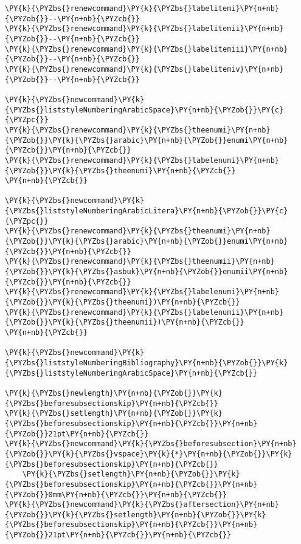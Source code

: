 \begin{Verbatim}[commandchars=\\\{\}]
\PY{k}{\PYZbs{}renewcommand}\PY{k}{\PYZbs{}labelitemi}\PY{n+nb}{\PYZob{}}--\PY{n+nb}{\PYZcb{}}
\PY{k}{\PYZbs{}renewcommand}\PY{k}{\PYZbs{}labelitemii}\PY{n+nb}{\PYZob{}}--\PY{n+nb}{\PYZcb{}}
\PY{k}{\PYZbs{}renewcommand}\PY{k}{\PYZbs{}labelitemiii}\PY{n+nb}{\PYZob{}}--\PY{n+nb}{\PYZcb{}}
\PY{k}{\PYZbs{}renewcommand}\PY{k}{\PYZbs{}labelitemiv}\PY{n+nb}{\PYZob{}}--\PY{n+nb}{\PYZcb{}}

\PY{k}{\PYZbs{}newcommand}\PY{k}{\PYZbs{}liststyleNumberingArabicSpace}\PY{n+nb}{\PYZob{}}\PY{c}{\PYZpc{}}
\PY{k}{\PYZbs{}renewcommand}\PY{k}{\PYZbs{}theenumi}\PY{n+nb}{\PYZob{}}\PY{k}{\PYZbs{}arabic}\PY{n+nb}{\PYZob{}}enumi\PY{n+nb}{\PYZcb{}}\PY{n+nb}{\PYZcb{}}
\PY{k}{\PYZbs{}renewcommand}\PY{k}{\PYZbs{}labelenumi}\PY{n+nb}{\PYZob{}}\PY{k}{\PYZbs{}theenumi}\PY{n+nb}{\PYZcb{}}
\PY{n+nb}{\PYZcb{}}

\PY{k}{\PYZbs{}newcommand}\PY{k}{\PYZbs{}liststyleNumberingArabicLitera}\PY{n+nb}{\PYZob{}}\PY{c}{\PYZpc{}}
\PY{k}{\PYZbs{}renewcommand}\PY{k}{\PYZbs{}theenumi}\PY{n+nb}{\PYZob{}}\PY{k}{\PYZbs{}arabic}\PY{n+nb}{\PYZob{}}enumi\PY{n+nb}{\PYZcb{}}\PY{n+nb}{\PYZcb{}}
\PY{k}{\PYZbs{}renewcommand}\PY{k}{\PYZbs{}theenumii}\PY{n+nb}{\PYZob{}}\PY{k}{\PYZbs{}asbuk}\PY{n+nb}{\PYZob{}}enumii\PY{n+nb}{\PYZcb{}}\PY{n+nb}{\PYZcb{}}
\PY{k}{\PYZbs{}renewcommand}\PY{k}{\PYZbs{}labelenumi}\PY{n+nb}{\PYZob{}}\PY{k}{\PYZbs{}theenumi})\PY{n+nb}{\PYZcb{}}
\PY{k}{\PYZbs{}renewcommand}\PY{k}{\PYZbs{}labelenumii}\PY{n+nb}{\PYZob{}}\PY{k}{\PYZbs{}theenumii})\PY{n+nb}{\PYZcb{}}
\PY{n+nb}{\PYZcb{}}

\PY{k}{\PYZbs{}newcommand}\PY{k}{\PYZbs{}liststyleNumberingBibliography}\PY{n+nb}{\PYZob{}}\PY{k}{\PYZbs{}liststyleNumberingArabicSpace}\PY{n+nb}{\PYZcb{}}

\PY{k}{\PYZbs{}newlength}\PY{n+nb}{\PYZob{}}\PY{k}{\PYZbs{}beforesubsectionskip}\PY{n+nb}{\PYZcb{}}
\PY{k}{\PYZbs{}setlength}\PY{n+nb}{\PYZob{}}\PY{k}{\PYZbs{}beforesubsectionskip}\PY{n+nb}{\PYZcb{}}\PY{n+nb}{\PYZob{}}21pt\PY{n+nb}{\PYZcb{}}
\PY{k}{\PYZbs{}newcommand}\PY{k}{\PYZbs{}beforesubsection}\PY{n+nb}{\PYZob{}}\PY{k}{\PYZbs{}vspace}\PY{k}{*}\PY{n+nb}{\PYZob{}}\PY{k}{\PYZbs{}beforesubsectionskip}\PY{n+nb}{\PYZcb{}}
    \PY{k}{\PYZbs{}setlength}\PY{n+nb}{\PYZob{}}\PY{k}{\PYZbs{}beforesubsectionskip}\PY{n+nb}{\PYZcb{}}\PY{n+nb}{\PYZob{}}0mm\PY{n+nb}{\PYZcb{}}\PY{n+nb}{\PYZcb{}}
\PY{k}{\PYZbs{}newcommand}\PY{k}{\PYZbs{}aftersection}\PY{n+nb}{\PYZob{}}\PY{k}{\PYZbs{}setlength}\PY{n+nb}{\PYZob{}}\PY{k}{\PYZbs{}beforesubsectionskip}\PY{n+nb}{\PYZcb{}}\PY{n+nb}{\PYZob{}}21pt\PY{n+nb}{\PYZcb{}}\PY{n+nb}{\PYZcb{}}


\end{Verbatim}
